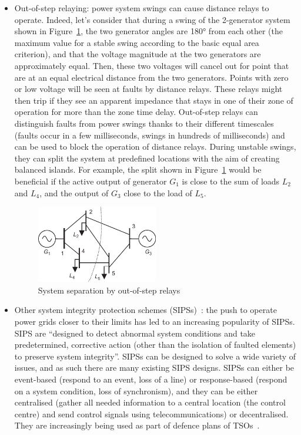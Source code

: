 \begin{itemize}
\begin{itemize}
        \item Out-of-step relaying: power system swings can cause distance relays to operate. Indeed, let's consider that during a swing of the 2-generator system shown in Figure~\ref{fig:OOS}, the two generator angles are 180° from each other (the maximum value for a stable swing according to the basic equal area criterion), and that the voltage magnitude at the two generators are approximately equal. Then, these two voltages will cancel out for point that are at an equal electrical distance from the two generators. Points with zero or low voltage will be seen at faults by distance relays. These relays might then trip if they see an apparent impedance that stays in one of their zone of operation for more than the zone time delay. Out-of-step relays can distinguish faults from power swings thanks to their different timescales (faults occur in a few milliseconds, swings in hundreds of milliseconds) and can be used to block the operation of distance relays. During unstable swings, they can split the system at predefined locations with the aim of creating balanced islands. For example, the split shown in Figure~\ref{fig:OOS} would be beneficial if the active output of generator \(G_1\) is close to the sum of loads \(L_2\) and \(L_4\), and the output of \(G_3\) close to the load of \(L_5\).
        \begin{figure}
            \centering
            \includegraphics[width = 0.5\textwidth]{Figs/Out_of_step.pdf}
            \caption{System separation by out-of-step relays~\cite{HorowitzBook}}
            \label{fig:OOS}
        \end{figure}
        \item Other system integrity protection schemes (SIPSs)~\cite{IEEE_SIPS, CIGRE_SIPS_tutorial}: the push to operate power grids closer to their limits has led to an increasing popularity of SIPSs. SIPS are ``designed to detect abnormal system conditions and take predetermined, corrective action (other than the isolation of faulted elements) to preserve system integrity''. SIPSs can be designed to solve a wide variety of issues, and as such there are many existing SIPS designs. SIPSs can either be event-based (respond to an event, \eg loss of a line) or response-based (respond on a system condition, \eg loss of synchronism), and they can be either centralised (gather all needed information to a central location (\eg the control centre) and send control signals using telecommunications) or decentralised. They are increasingly being used as part of defence plans of TSOs~\cite{CigreDefensePlan, ENTSOEdefencePlan}.
    \end{itemize}
\end{itemize}



